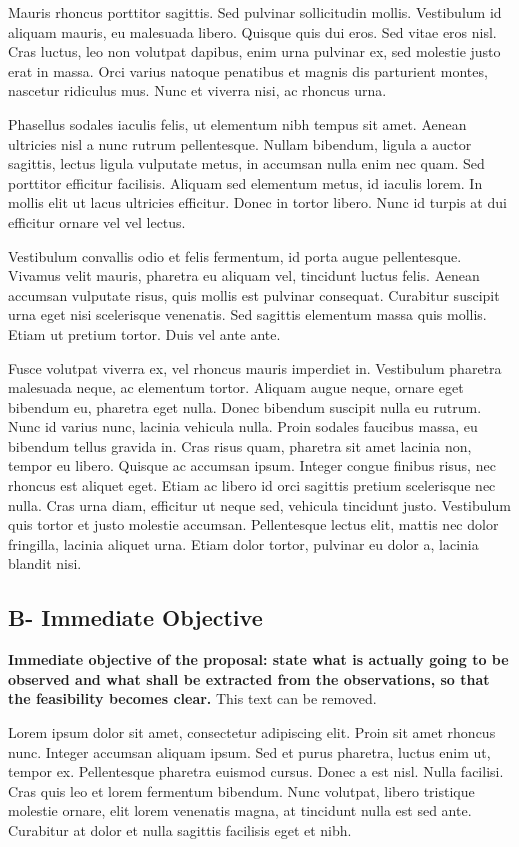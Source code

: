 \documentclass{article}
\begin{document}
Mauris rhoncus porttitor sagittis. Sed pulvinar sollicitudin mollis. Vestibulum id aliquam mauris, eu malesuada libero. Quisque quis dui eros. Sed vitae eros nisl. Cras luctus, leo non volutpat dapibus, enim urna pulvinar ex, sed molestie justo erat in massa. Orci varius natoque penatibus et magnis dis parturient montes, nascetur ridiculus mus. Nunc et viverra nisi, ac rhoncus urna.

Phasellus sodales iaculis felis, ut elementum nibh tempus sit amet. Aenean ultricies nisl a nunc rutrum pellentesque. Nullam bibendum, ligula a auctor sagittis, lectus ligula vulputate metus, in accumsan nulla enim nec quam. Sed porttitor efficitur facilisis. Aliquam sed elementum metus, id iaculis lorem. In mollis elit ut lacus ultricies efficitur. Donec in tortor libero. Nunc id turpis at dui efficitur ornare vel vel lectus.

Vestibulum convallis odio et felis fermentum, id porta augue pellentesque. Vivamus velit mauris, pharetra eu aliquam vel, tincidunt luctus felis. Aenean accumsan vulputate risus, quis mollis est pulvinar consequat. Curabitur suscipit urna eget nisi scelerisque venenatis. Sed sagittis elementum massa quis mollis. Etiam ut pretium tortor. Duis vel ante ante.

Fusce volutpat viverra ex, vel rhoncus mauris imperdiet in. Vestibulum pharetra malesuada neque, ac elementum tortor. Aliquam augue neque, ornare eget bibendum eu, pharetra eget nulla. Donec bibendum suscipit nulla eu rutrum. Nunc id varius nunc, lacinia vehicula nulla. Proin sodales faucibus massa, eu bibendum tellus gravida in. Cras risus quam, pharetra sit amet lacinia non, tempor eu libero. Quisque ac accumsan ipsum. Integer congue finibus risus, nec rhoncus est aliquet eget. Etiam ac libero id orci sagittis pretium scelerisque nec nulla. Cras urna diam, efficitur ut neque sed, vehicula tincidunt justo. Vestibulum quis tortor et justo molestie accumsan. Pellentesque lectus elit, mattis nec dolor fringilla, lacinia aliquet urna. Etiam dolor tortor, pulvinar eu dolor a, lacinia blandit nisi.

\subsection{B- Immediate Objective}
{\bf Immediate objective of the proposal: state what is actually going to be observed and what shall be extracted from the observations, so that the feasibility becomes clear.} This text can be removed.

Lorem ipsum dolor sit amet, consectetur adipiscing elit. Proin sit amet rhoncus nunc. Integer accumsan aliquam ipsum. Sed et purus pharetra, luctus enim ut, tempor ex. Pellentesque pharetra euismod cursus. Donec a est nisl. Nulla facilisi. Cras quis leo et lorem fermentum bibendum. Nunc volutpat, libero tristique molestie ornare, elit lorem venenatis magna, at tincidunt nulla est sed ante. Curabitur at dolor et nulla sagittis facilisis eget et nibh.
\end{document}

